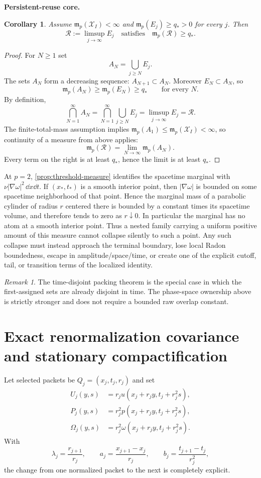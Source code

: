 \documentclass[11pt]{article}
\newtheorem{corollary}[theorem]{Corollary}
\theoremstyle{definition}\newtheorem{definition}[theorem]{Definition}
\theoremstyle{remark}\newtheorem{remark}[theorem]{Remark}
\begin{document}
\medskip
\noindent\textbf{Persistent-reuse core.}
\begin{corollary}\label{cor:reuse-core}
Assume $\mathfrak m_p(\mathcal X_I)<\infty$ and
$\mathfrak m_p(E_j)\ge q_*>0$ for every $j$.  Then
\[
\mathcal R:=\limsup_{j\to\infty}E_j
\quad\text{satisfies}\quad
\boxed{\mathfrak m_p(\mathcal R)\ge q_*.}
\]
\end{corollary}
\begin{proof}
For $N\ge1$ set
\[
A_N=\bigcup_{j\ge N}E_j.
\]
The sets $A_N$ form a decreasing sequence:
$A_{N+1}\subset A_N$.  Moreover $E_N\subset A_N$, so
\[
\mathfrak m_p(A_N)\ge\mathfrak m_p(E_N)\ge q_*
\qquad\text{for every }N.
\]
By definition,
\[
\bigcap_{N=1}^\infty A_N
=\bigcap_{N=1}^\infty\bigcup_{j\ge N}E_j
=\limsup_{j\to\infty}E_j
=\mathcal R.
\]
The finite-total-mass assumption implies
$\mathfrak m_p(A_1)\le\mathfrak m_p(\mathcal X_I)<\infty$, so continuity of a
measure from above applies:
\[
\mathfrak m_p(\mathcal R)
=\lim_{N\to\infty}\mathfrak m_p(A_N).
\]
Every term on the right is at least $q_*$, hence the limit is at least $q_*$.
\end{proof}

At $p=2$, \cref{prop:threshold-measure} identifies the spacetime marginal
with $\nu|\nabla\omega|^2\,\dd x\dd t$.  If $(x_*,t_*)$ is a smooth interior
point, then $|\nabla\omega|$ is bounded on some spacetime neighborhood of that
point.  Hence the marginal mass of a parabolic cylinder of radius $r$ centered
there is bounded by a constant times its spacetime volume, and therefore tends
to zero as $r\downarrow0$.  In particular the marginal has no atom at a smooth
interior point.  Thus a nested family carrying a uniform positive amount of
this measure cannot collapse silently to such a point.  Any such collapse must
instead approach the terminal boundary, lose local Radon boundedness, escape in
amplitude/space/time, or create one of the explicit cutoff, tail, or transition
terms of the localized identity.

\begin{remark}
The time-disjoint packing theorem is the special case in which the
first-assigned sets are already disjoint in time.  The phase-space ownership
above is strictly stronger and does not require a bounded raw overlap
constant.
\end{remark}

\section{Exact renormalization covariance and stationary compactification}
Let selected packets be $Q_j=(x_j,t_j,r_j)$ and set
\[
\begin{aligned}
U_j(y,s)&=r_j u(x_j+r_jy,t_j+r_j^2s),\\
P_j(y,s)&=r_j^2p(x_j+r_jy,t_j+r_j^2s),\\
\Omega_j(y,s)&=r_j^2\omega(x_j+r_jy,t_j+r_j^2s).
\end{aligned}
\]
With
\[
\lambda_j=\frac{r_{j+1}}{r_j},\qquad
 a_j=\frac{x_{j+1}-x_j}{r_j},\qquad
 b_j=\frac{t_{j+1}-t_j}{r_j^2},
\]
the change from one normalized packet to the next is completely explicit.
\end{document}
